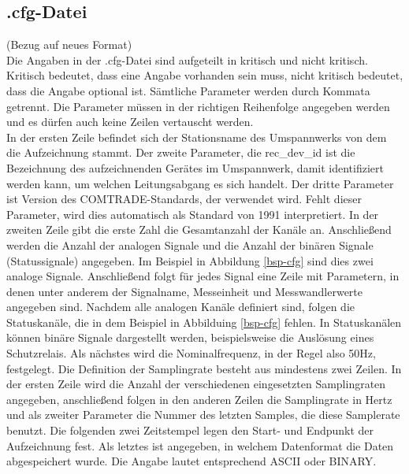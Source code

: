 \documentclass{scrartcl}
\begin{document}
\begin{onehalfspace}
\subsection{.cfg-Datei}
(Bezug auf neues Format) \\
Die Angaben in der .cfg-Datei sind aufgeteilt in \glqq kritisch\grqq{} und \glqq nicht kritisch\grqq. \glqq Kritisch\grqq{} bedeutet, dass eine Angabe vorhanden sein muss, \glqq nicht kritisch\grqq{} bedeutet, dass die Angabe optional ist. Sämtliche Parameter werden durch Kommata getrennt. Die Parameter müssen in der richtigen Reihenfolge angegeben werden und es dürfen auch keine Zeilen vertauscht werden. \\
In der ersten Zeile befindet sich der Stationsname des Umspannwerks von dem die Aufzeichnung stammt. Der zweite Parameter, die rec\_dev\_id ist die Bezeichnung des aufzeichnenden Gerätes im Umspannwerk, damit identifiziert werden kann, um welchen Leitungsabgang es sich handelt. Der dritte Parameter ist Version des COMTRADE-Standards, der verwendet wird. Fehlt dieser Parameter, wird dies automatisch als Standard von 1991 interpretiert. In der zweiten Zeile gibt die erste Zahl die Gesamtanzahl der Kanäle an. Anschließend werden die Anzahl der analogen Signale und die Anzahl der binären Signale (Statussignale) angegeben. Im Beispiel in Abbildung \ref{bsp-cfg} sind dies zwei analoge Signale. Anschließend folgt für jedes Signal eine Zeile mit Parametern, in denen unter anderem der Signalname, Messeinheit und Messwandlerwerte angegeben sind. Nachdem alle analogen Kanäle definiert sind, folgen die Statuskanäle, die in dem Beispiel in Abbilduing \ref{bsp-cfg} fehlen. In Statuskanälen können binäre Signale dargestellt werden, beispielsweise die Auslösung eines Schutzrelais. Als nächstes wird die Nominalfrequenz, in der Regel also 50Hz, festgelegt. Die Definition der Samplingrate besteht aus mindestens zwei Zeilen. In der ersten Zeile wird die Anzahl der verschiedenen eingesetzten Samplingraten angegeben, anschließend folgen in den anderen Zeilen die Samplingrate in Hertz und als zweiter Parameter die Nummer des letzten Samples, die diese Samplerate benutzt. Die folgenden zwei Zeitstempel legen den Start- und Endpunkt der Aufzeichnung fest. Als letztes ist angegeben, in welchem Datenformat die Daten abgespeichert wurde. Die Angabe lautet entsprechend \glqq ASCII\grqq{} oder \glqq BINARY\grqq.


\end{onehalfspace}
\end{document}
